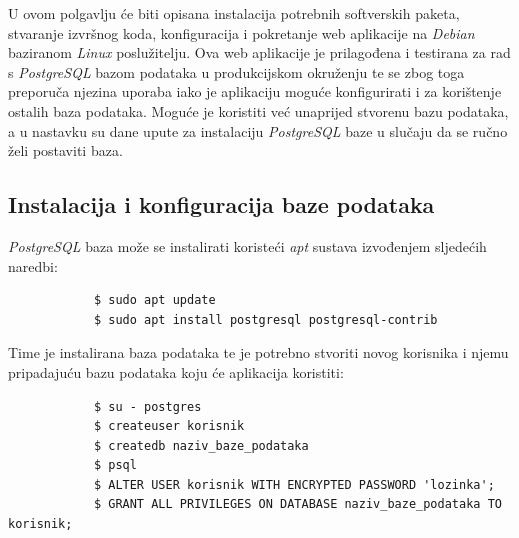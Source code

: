 %		
%			
%			

		U ovom polgavlju će biti opisana instalacija potrebnih softverskih paketa, stvaranje izvršnog koda, konfiguracija i pokretanje web aplikacije na \textit{Debian} baziranom \textit{Linux} poslužitelju. Ova web aplikacije je prilagođena i testirana za rad s \textit{PostgreSQL} bazom podataka u produkcijskom okruženju te se zbog toga preporuča njezina uporaba iako je aplikaciju moguće konfigurirati i za korištenje ostalih baza podataka. Moguće je koristiti već unaprijed stvorenu bazu podataka, a u nastavku su dane upute za instalaciju \textit{PostgreSQL} baze u slučaju da se ručno želi postaviti baza.
		
		\subsection{Instalacija i konfiguracija baze podataka}
		\textit{PostgreSQL} baza može se instalirati koristeći \textit{apt} sustava izvođenjem sljedećih naredbi:
		\begin{lstlisting}
			$ sudo apt update
			$ sudo apt install postgresql postgresql-contrib
		\end{lstlisting}
		Time je instalirana baza podataka te je potrebno stvoriti novog korisnika i njemu pripadajuću bazu podataka koju će aplikacija koristiti:
		\begin{lstlisting}
			$ su - postgres 
			$ createuser korisnik
			$ createdb naziv_baze_podataka
			$ psql
			$ ALTER USER korisnik WITH ENCRYPTED PASSWORD 'lozinka';
			$ GRANT ALL PRIVILEGES ON DATABASE naziv_baze_podataka TO korisnik;
		\end{lstlisting}
		
